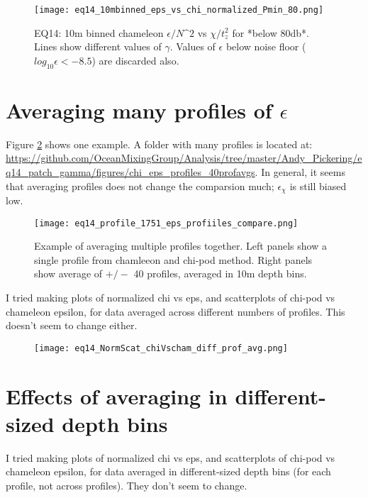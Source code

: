 \documentclass[11pt]{article}
\begin{document}
\begin{figure}[htbp]
\texttt{[image: eq14\_10mbinned\_eps\_vs\_chi\_normalized\_Pmin\_80.png]}
\caption{EQ14: 10m binned  chameleon $\epsilon/N\^2$ vs $\chi/t_{z}^{2}$ for *below 80db*. Lines show different values of $\gamma$. Values of $\epsilon$ below noise floor ($log_{10}\epsilon<-8.5$) are discarded also.}
\label{}
\end{figure}




\clearpage
\section{Averaging many profiles of $\epsilon$}

Figure \ref{prof_avg_ex} shows one example. A folder with many profiles is located at:
\url{https://github.com/OceanMixingGroup/Analysis/tree/master/Andy_Pickering/eq14_patch_gamma/figures/chi_eps_profiles_40profavgs}. In general, it seems that averaging profiles does not change the comparsion much; $\epsilon_{\chi}$ is still biased low.

\begin{figure}[htbp]
\texttt{[image: eq14\_profile\_1751\_eps\_profiiles\_compare.png]}
\caption{Example of averaging multiple profiles together. Left panels show a single profile from chamleeon and chi-pod method. Right panels show average of $+/-$ 40 profiles, averaged in 10m depth bins.}
\label{prof_avg_ex}
\end{figure}



I tried making plots of normalized chi vs eps, and scatterplots of chi-pod vs chameleon epsilon, for data averaged across different numbers of profiles. This doesn't seem to change either.
\begin{figure}[htbp]
\texttt{[image: eq14\_NormScat\_chiVscham\_diff\_prof\_avg.png]}
\caption{}
\label{}
\end{figure}




\clearpage
\section{Effects of averaging in different-sized depth bins}

I tried making plots of normalized chi vs eps, and scatterplots of chi-pod vs chameleon epsilon, for data averaged in different-sized depth bins (for each profile, not across profiles). They don't seem to change.
\end{document}
